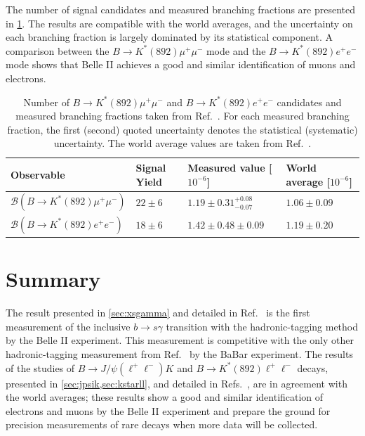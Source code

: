 \documentclass{moriond}
\def\Kstar{\ensuremath{K^{*}(892)}\xspace}
\newcommand\Tstrut{\rule{0pt}{2.6ex}}         %
\newcommand\Bstrut{\rule[-0.9ex]{0pt}{0pt}}   %
\begin{document}

The number of signal candidates and measured branching fractions are presented in \cref{tab:kstarll}.
The results are compatible with the world averages, and the uncertainty on each branching fraction is largely dominated by its statistical component.
A comparison between the $B\to\Kstar\mu^+\mu^-$ mode and the $B\to\Kstar e^+e^-$ mode shows that Belle II achieves a good and similar identification of muons and electrons.

\begin{table}[tb]
\caption{Number of $B\to\Kstar\mu^+\mu^-$ and $B\to\Kstar e^+e^-$ candidates and measured branching fractions taken from Ref.~{\protect\cite{Belle-II:2022fky}}.
For each measured branching fraction, the first (second) quoted uncertainty denotes the statistical (systematic) uncertainty.
The world average values are taken from Ref.~{\protect\cite{ParticleDataGroup:2022pth}}.}
\vspace{0.4cm}
\centering
\begin{tabular}{|llll|}
\hline
Observable & Signal Yield & Measured value [$10^{-6}$] & World average [$10^{-6}$] \Tstrut\Bstrut\\
\hline
$\mathcal{B}(B\to\Kstar\mu^+\mu^-)$ & $22\pm6$ & $1.19 \pm 0.31^{+0.08}_{-0.07}$ & $1.06\pm0.09$ \Tstrut\\
$\mathcal{B}(B\to\Kstar e^+e^-)$ & $18\pm6$ & $1.42 \pm 0.48\pm 0.09$ & $1.19\pm0.20$ \Bstrut\\
\hline
\end{tabular}
\label{tab:kstarll}
\end{table}

\section{Summary}
The result presented in \cref{sec:xsgamma} and detailed in Ref.~\cite{Belle-II:2022hys} is the first measurement of the inclusive $b\to s\gamma$ transition with the hadronic-tagging method by the Belle II experiment.
This measurement is competitive with the only other hadronic-tagging measurement from Ref.~\cite{BaBar:2007yhb} by the BaBar experiment.
The results of the studies of $B \to J/\psi(\ell^+\ell^-) K$ and $B \to K^{\ast}(892)\ell^+\ell^-$ decays, presented in \cref{sec:jpsik,sec:kstarll}, and detailed in Refs.~\cite{Belle-II:2022dbo,Belle-II:2022fky}, are in agreement with the world averages; these results show a good and similar identification of electrons and muons by the Belle II experiment and prepare the ground for precision measurements of rare decays when more data will be collected.
\end{document}
